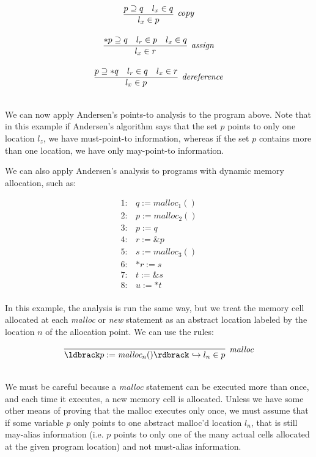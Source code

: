 \documentclass[11pt]{article}
\newcommand{\parg}[1] %
  {\ldbrack #1 \rdbrack}
\begin{document}
\begin{sloppypar}

\[
\begin{array}{c}
\infer[\textit{copy}]
	{l_x \in p}
	{p \supseteq q & l_x \in q}\\[3ex]
		
\infer[\textit{assign}]
	{l_x \in r}
	{*p \supseteq q & l_r \in p & l_x \in q}\\[3ex]
	
\infer[\textit{dereference}]
	{l_x \in p}
	{p \supseteq *q & l_r \in q & l_x \in r}\\[3ex]
	
\end{array}
\]

We can now apply Andersen's points-to analysis to the program above.  Note that in this example if Andersen's algorithm says that the set $p$ points to only one location $l_z$, we have must-point-to information, whereas if the set $p$ contains more than one location, we have only may-point-to information.

We can also apply Andersen's analysis to programs with dynamic memory allocation, such as:

\[
\begin{array}{ll}
1: & q := \textit{malloc}_1()\\
2: & p := \textit{malloc}_2()\\
3: & p := q\\
4: & r := \&p\\
5: & s := \textit{malloc}_3()\\
6: & *r := s\\
7: & t := \&s\\
8: & u := *t\\
\end{array}
\]

In this example, the analysis is run the same way, but we treat the memory cell allocated at each \textit{malloc} or \textit{new} statement as an abstract location labeled by the location $n$ of the allocation point.  We can use the rules:

\[
\begin{array}{c}
\infer[\textit{malloc}]
	{\parg{p := \textit{malloc}_n()} \hookrightarrow l_n \in p}
	{}\\[3ex]
	
\end{array}
\]

We must be careful because a \textit{malloc} statement can be executed more than once, and each time it executes, a new memory cell is allocated.  Unless we have some other means of proving that the malloc executes only once, we must assume that if some variable $p$ only points to one abstract malloc'd location $l_n$, that is still may-alias information (i.e. $p$ points to only one of the many actual cells allocated at the given program location) and not must-alias information.


\end{sloppypar}
\end{document}
